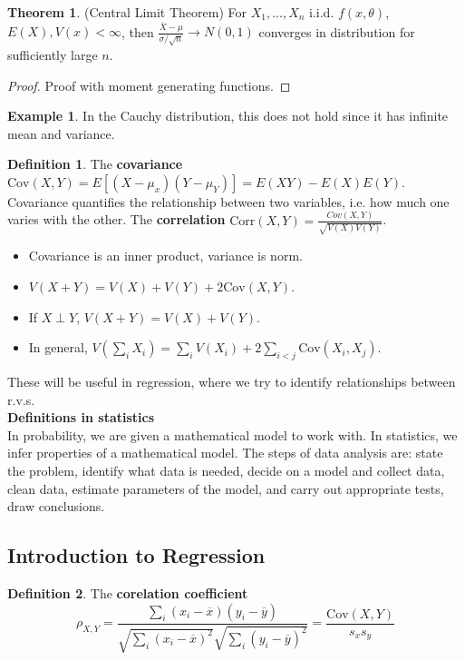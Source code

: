 \documentclass[12pt, a4paper]{article}
\theoremstyle{definition}
\newtheorem{thm}{Theorem}
\newtheorem{definition}{Definition}
\newtheorem{example}{Example}
\newcommand{\ol}{\overline}
\newcommand{\f}{\frac}
\newcommand{\Cov}{\mathrm{Cov}}
\newcommand{\Corr}{\mathrm{Corr}}
\begin{document}
	\begin{thm}(Central Limit Theorem)
		For $X_1, \ldots, X_n$ i.i.d. $f(x, \theta)$, $E(X), V(x) < \infty$, then $\f{\ol{X} - \mu}{\sigma / \sqrt{n}} \to N(0,1)$ converges in distribution for sufficiently large $n$.
	\end{thm}
	\begin{proof}
		Proof with moment generating functions.
	\end{proof}
	\begin{example}
		In the Cauchy distribution, this does not hold since it has infinite mean and variance.
	\end{example}
	\begin{definition}
		The {\bf covariance } $\Cov(X,Y) = E[(X - \mu_x)(Y - \mu_Y)] = E(XY) - E(X)E(Y)$. Covariance quantifies the relationship between two variables, i.e. how much one varies with the other. The {\bf correlation } $\Corr(X,Y) = \f{Cov(X,Y)}{\sqrt{V(X)V(Y)}}$.
	\end{definition}
	\begin{itemize}
		\item Covariance is an inner product, variance is norm.
		\item $V(X + Y) = V(X) + V(Y) + 2\Cov(X,Y)$.
		\item If $X \perp Y$, $V(X+Y) = V(X) + V(Y)$. 
		\item  In general, $V(\sum_i X_i) = \sum_i V(X_i) + 2 \sum_{i < j}\Cov(X_i,X_j)$.
	\end{itemize}
	These will be useful in regression, where we try to identify relationships between r.v.s.\\
	
	{\bf Definitions in statistics} \\ 
	
	In probability, we are given a mathematical model to work with. In statistics, we infer properties of a mathematical model. The steps of data analysis are: state the problem, identify what data is needed, decide on a model and collect data, clean data, estimate parameters of the model, and carry out appropriate tests, draw conclusions.
	
	\subsection{Introduction to Regression}
	
	\begin{definition}
		The {\bf corelation coefficient}
		$$
			\rho_{X,Y} = \f{\sum_i (x_i - \ol{x}) (y_i - \ol{y})}{\sqrt{\sum_i (x_i - \ol{x})^2} \sqrt{\sum_i (y_i - \ol{y})^2} } = \f{\Cov(X,Y)}{s_x s_y}
		$$
	\end{definition}
\end{document}
